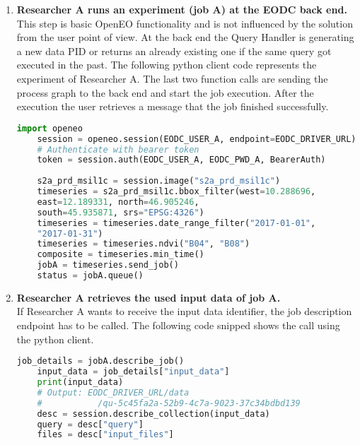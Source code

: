 \documentclass[draft,final]{vutinfth} %
\begin{document}
\begin{enumerate}
	\item \textbf{Researcher A runs an experiment (job A) at the EODC back end.} \\
	This step is basic OpenEO functionality and is not influenced by the solution from the user point of view. At the back end the Query Handler is generating a new data PID or returns an already existing one if the same query got executed in the past. The following python client code represents the experiment of Researcher A. The last two function calls are sending the process graph to the back end and start the job execution. After the execution the user retrieves a message that the job finished successfully.  
	\begin{lstlisting}[frame=single, language=Python]
	import openeo
	session = openeo.session(EODC_USER_A, endpoint=EODC_DRIVER_URL)
	# Authenticate with bearer token
	token = session.auth(EODC_USER_A, EODC_PWD_A, BearerAuth)
	
	s2a_prd_msil1c = session.image("s2a_prd_msil1c")
	timeseries = s2a_prd_msil1c.bbox_filter(west=10.288696, 
	east=12.189331, north=46.905246,
	south=45.935871, srs="EPSG:4326")
	timeseries = timeseries.date_range_filter("2017-01-01", 
	"2017-01-31")
	timeseries = timeseries.ndvi("B04", "B08")
	composite = timeseries.min_time()
	jobA = timeseries.send_job()
	status = jobA.queue()
	\end{lstlisting}
	
	\item \textbf{Researcher A retrieves the used input data of job A.} \\
	If Researcher A wants to receive the input data identifier, the job description endpoint has to be called. The following code snipped shows the call using the python client.
	
	\begin{lstlisting}[frame=single, language=Python]
	job_details = jobA.describe_job()
	input_data = job_details["input_data"]
	print(input_data)
	# Output: EODC_DRIVER_URL/data
	#			/qu-5c45fa2a-52b9-4c7a-9023-37c34bdbd139
	desc = session.describe_collection(input_data)
	query = desc["query"]
	files = desc["input_files"]
	\end{lstlisting}
	

\end{enumerate}
\end{document}
